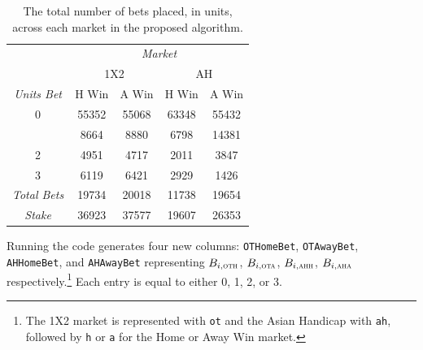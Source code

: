\documentclass[a4paper,10pt]{report}
\begin{document}
\begin{table}[h!]\begin{center}\begin{tabular}{c||cc|cc}
					   & \multicolumn{4}{|c}{\textit{Market}} \\
					   & \multicolumn{2}{|c}{1X2} & \multicolumn{2}{|c}{AH} \\
	\textit{Units Bet} & H Win & A Win & H Win & A Win \\ \hline\hline
	0 & 55352 & 55068 & 63348 & 55432 \\ \hdashline
	1 & 8664 & 8880 & 6798 & 14381 \\ 
	2 & 4951 & 4717 & 2011 & 3847 \\
	3 & 6119 & 6421 & 2929 & 1426 \\ \hline \hline
	\textit{Total Bets} & 19734 & 20018 & 11738 & 19654 \\ 
	\textit{Stake}      & 36923 & 37577 & 19607& 26353
\end{tabular}\end{center}\caption{The total number of bets placed, in units, across each market in the proposed algorithm.}\label{tab:betstats}
\end{table}

Running the code generates four new columns: \lstinline|OTHomeBet|, \lstinline|OTAwayBet|, \lstinline|AHHomeBet|, and \lstinline|AHAwayBet| representing $B_{i,\textsc{oth}}$, $B_{i,\textsc{ota}}$, $B_{i,\textsc{ahh}}$, $B_{i,\textsc{aha}}$ respectively.\footnote{The 1X2 market is represented with \lstinline|ot| and the Asian Handicap with \lstinline|ah|, followed by \lstinline|h| or \lstinline|a| for the Home or Away Win market.} Each entry is equal to either 0, 1, 2, or 3. 
\end{document}
